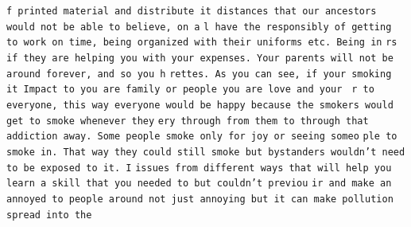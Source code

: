 \documentclass{article} %
\begin{document}
\texttt{\fontsize{.28cm}{.1cm}\selectfont \frenchspacing f printed material and distribute it distances that our ancestors would not be able to believe, on a}
\texttt{\fontsize{.28cm}{.1cm}\selectfont \frenchspacing l have the responsibly of getting to work on time, being organized with their uniforms etc. Being in}
\texttt{\fontsize{.28cm}{.1cm}\selectfont \frenchspacing rs if they are helping you with your expenses. Your parents will not be around forever, and so you h}
\texttt{\fontsize{.28cm}{.1cm}\selectfont \frenchspacing rettes. As you can see, if your smoking it Impact to you are family or people you are love and your }
\texttt{\fontsize{.28cm}{.1cm}\selectfont \frenchspacing r to everyone, this way everyone would be happy because the smokers would get to smoke whenever they}
\texttt{\fontsize{.28cm}{.1cm}\selectfont \frenchspacing ery through from them to through that addiction away. Some people smoke only for joy or seeing someo}
\texttt{\fontsize{.28cm}{.1cm}\selectfont \frenchspacing ple to smoke in. That way they could still smoke but bystanders wouldn't need to be exposed to it. I}
\texttt{\fontsize{.28cm}{.1cm}\selectfont \frenchspacing  issues from different ways that will help you learn a skill that you needed to but couldn't previou}
\texttt{\fontsize{.28cm}{.1cm}\selectfont \frenchspacing ir and make an annoyed to people around not just annoying but it can make pollution spread into the }
\end{document}
